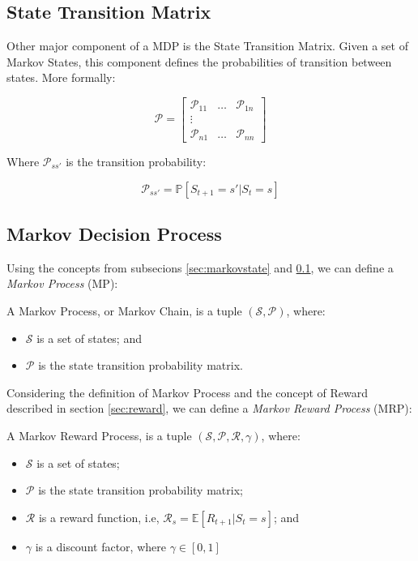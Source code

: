 \subsection{State Transition Matrix}\label{sec:statetransition}

Other major component of a MDP is the State Transition Matrix. Given a set of Markov States, this component defines the probabilities of transition between states. More formally:

\begin{equation}
\mathcal{P} = \begin{bmatrix}
\mathcal{P}_{11} &  \dots  & \mathcal{P}_{1n} \\
\vdots \\
\mathcal{P}_{n1} &  \dots  & \mathcal{P}_{nn} 
\end{bmatrix}
\end{equation}

Where $\mathcal{P}_{ss'}$ is the transition probability:

\begin{equation}
\mathcal{P}_{ss'} = \mathbb{P}[S_{t+1} = s' | S_{t} = s]
\end{equation}

\subsection{Markov Decision Process}

Using the concepts from subsecions \ref{sec:markovstate} and \ref{sec:statetransition}, we can define a \textit{Markov Process} (MP):

\begin{definition}
	A Markov Process, or Markov Chain, is a tuple $(\mathcal{S}, \mathcal{P})$, where:
	\begin{itemize}
		\item $\mathcal{S}$ is a set of states; and
		\item $\mathcal{P}$ is the state transition probability matrix.
	\end{itemize}
\end{definition}

Considering the definition of Markov Process and the concept of Reward described in section \ref{sec:reward}, we can define a \textit{Markov Reward Process} (MRP):

\begin{definition}
	A Markov Reward Process, is a tuple $(\mathcal{S}, \mathcal{P}, \mathcal{R}, \gamma)$, where:
	\begin{itemize}
		\item $\mathcal{S}$ is a set of states; 
		\item $\mathcal{P}$ is the state transition probability matrix;
		\item $\mathcal{R}$ is a reward function, i.e, $\mathcal{R}_{s} = \mathbb{E}[R_{t+1} | S_{t} = s]$; and
		\item $\gamma$ is a discount factor, where $\gamma \in [0,1]$
	\end{itemize}
\end{definition}

